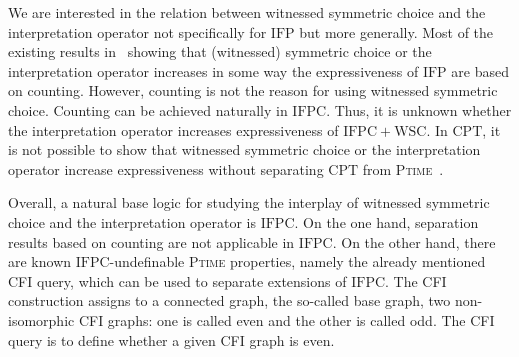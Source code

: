 \documentclass[]{lmcs}
\newcommand{\PTime}{\textsc{Ptime}}
\newcommand{\CPT}{\ensuremath{\mathrm{CPT}}}
\newcommand{\IFP}{\ensuremath{\mathrm{IFP}}}
\newcommand{\IFPC}{\ensuremath{\mathrm{IFPC}}}
\newcommand{\IFPCWSC}{\ensuremath{\mathrm{IFPC{+}WSC}}}
\begin{document}
We are interested in the relation between witnessed symmetric choice and the interpretation operator not specifically for \IFP{} but more generally.
Most of the existing results in~\cite{GireHoang98,DawarRicherby03} showing that (witnessed) symmetric choice or the interpretation operator increases in some way the expressiveness of \IFP{} are based on counting.
However, counting is not the reason for using witnessed symmetric choice.
Counting can be achieved naturally in \IFPC{}.
Thus, it is unknown whether the interpretation operator increases expressiveness of \IFPCWSC{}.
In \CPT{},
it is not possible to show that witnessed symmetric choice or the interpretation operator
increase expressiveness without separating \CPT{} from \PTime{}~\cite{LichterSchweitzer24}.

Overall, a natural base logic for studying the interplay of witnessed symmetric choice
and the interpretation operator is \IFPC{}.
On the one hand, separation results based on counting are not applicable in \IFPC{}.
On the other hand, there are known \IFPC{}-undefinable \PTime{} properties, namely the already mentioned CFI query,
which can be used to separate extensions of \IFPC{}.
The CFI construction assigns to a connected graph, the so-called base graph,
two non-isomorphic CFI graphs: one is called even and the other is called odd.
The CFI query is to define whether a given CFI graph is even.
\end{document}
